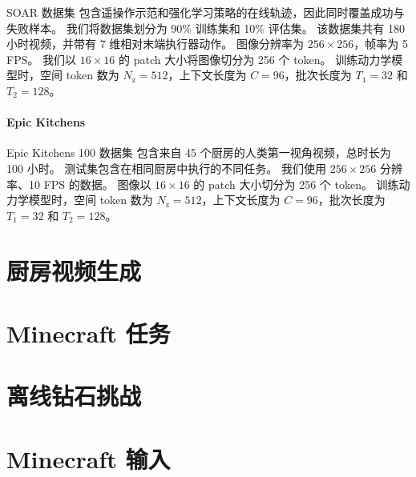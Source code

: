 SOAR 数据集\citep{soar} 包含遥操作示范和强化学习策略的在线轨迹，因此同时覆盖成功与失败样本。
我们将数据集划分为 90\% 训练集和 10\% 评估集。
该数据集共有 180 小时视频，并带有 7 维相对末端执行器动作。
图像分辨率为 $256 \times 256$，帧率为 5 FPS。
我们以 $16 \times 16$ 的 patch 大小将图像切分为 256 个 token。
训练动力学模型时，空间 token 数为 $N_\mathrm{z} = 512$，上下文长度为 $C = 96$，批次长度为 $T_1 = 32$ 和 $T_2 = 128$。

\paragraph{Epic Kitchens}

Epic Kitchens 100 数据集\citep{epickitchens} 包含来自 45 个厨房的人类第一视角视频，总时长为 100 小时。
测试集包含在相同厨房中执行的不同任务。
我们使用 $256 \times 256$ 分辨率、10 FPS 的数据。
图像以 $16 \times 16$ 的 patch 大小切分为 256 个 token。
训练动力学模型时，空间 token 数为 $N_\mathrm{z} = 512$，上下文长度为 $C = 96$，批次长度为 $T_1 = 32$ 和 $T_2 = 128$。

\clearpage
\section{厨房视频生成}
\vfill

\vfill

\section{Minecraft 任务}
\vspace*{-2ex}

\vspace*{2ex}

\vspace*{2ex}

\clearpage

\section{离线钻石挑战}


\clearpage

\enlargethispage{\baselineskip}
\vspace*{-9ex}
\section{Minecraft 输入}
\vspace*{-1ex}


